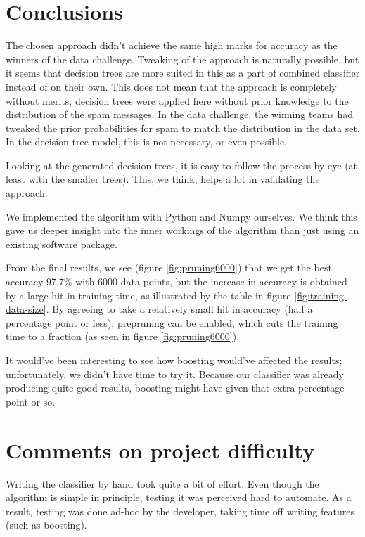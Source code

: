 \documentclass[a4paper,10pt]{article}
\begin{document}
\section{Conclusions}

The chosen approach didn't achieve the same high marks for accuracy as
the winners of the data challenge.  Tweaking of the approach is
naturally possible, but it seems that decision trees are more suited in
this as a part of combined classifier instead of on their own.  This
does not mean that the approach is completely without merits; decision
trees were applied here without prior knowledge to the distribution of
the spam messages.  In the data challenge, the winning teams had tweaked
the prior probabilities for spam to match the distribution in the data
set.  In the decision tree model, this is not necessary, or even
possible.

Looking at the generated decision trees, it is easy to follow the
process by eye (at least with the smaller trees).  This, we think, helps
a lot in validating the approach.

We implemented the algorithm with Python and Numpy ourselves.  We think
this gave us deeper insight into the inner workings of the algorithm
than just using an existing software package.

From the final results, we see (figure \ref{fig:pruning6000}) that we
get the best accuracy 97.7\% with 6000 data points, but the increase in
accuracy is obtained by a large hit in training time, as illustrated by
the table in figure \ref{fig:training-data-size}.  By agreeing to take a
relatively small hit in accuracy (half a percentage point or less),
prepruning can be enabled, which cuts the training time to a fraction
(as seen in figure \ref{fig:pruning6000}).

It would've been interesting to see how
boosting\cite[p. 360]{alpaydin2004} would've affected the results;
unfortunately, we didn't have time to try it.  Because our classifier
was already producing quite good results, boosting might have given that
extra percentage point or so.

\section{Comments on project difficulty}

Writing the classifier by hand took quite a bit of effort.  Even though
the algorithm is simple in principle, testing it was perceived hard to
automate.  As a result, testing was done ad-hoc by the developer, taking
time off writing features (such as boosting).
\end{document}
